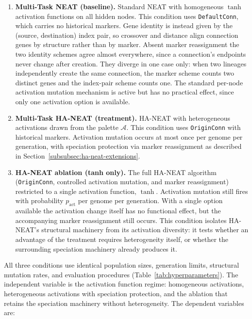 \documentclass[12pt]{article}
\begin{document}
\begin{enumerate}
    \item \textbf{Multi-Task NEAT (baseline).} Standard NEAT with homogeneous $\tanh$ activation functions on all hidden nodes. This condition uses \texttt{DefaultConn}, which carries no historical markers. Gene identity is instead given by the (source, destination) index pair, so crossover and distance align connection genes by structure rather than by marker. Absent marker reassignment the two identity schemes agree almost everywhere, since a connection's endpoints never change after creation. They diverge in one case only: when two lineages independently create the same connection, the marker scheme counts two distinct genes and the index-pair scheme counts one. The standard per-node activation mutation mechanism is active but has no practical effect, since only one activation option is available.

    \item \textbf{Multi-Task HA-NEAT (treatment).} HA-NEAT with heterogeneous activations drawn from the palette $\mathcal{A}$. This condition uses \texttt{OriginConn} with historical markers. Activation mutation occurs at most once per genome per generation, with speciation protection via marker reassignment as described in Section~\ref{subsubsec:ha-neat-extensions}.

    \item \textbf{HA-NEAT ablation (tanh only).} The full HA-NEAT algorithm (\texttt{OriginConn}, controlled activation mutation, and marker reassignment) restricted to a single activation function, $\tanh$. Activation mutation still fires with probability $p_{\text{act}}$ per genome per generation. With a single option available the activation change itself has no functional effect, but the accompanying marker reassignment still occurs. This condition isolates HA-NEAT's structural machinery from its activation diversity: it tests whether an advantage of the treatment requires heterogeneity itself, or whether the surrounding speciation machinery already produces it.
\end{enumerate}

All three conditions use identical population sizes, generation limits, structural mutation rates, and evaluation procedures (Table~\ref{tab:hyperparameters}).
The independent variable is the activation function regime: homogeneous activations, heterogeneous activations with speciation protection, and the ablation that retains the speciation machinery without heterogeneity.
The dependent variables are:
\end{document}
